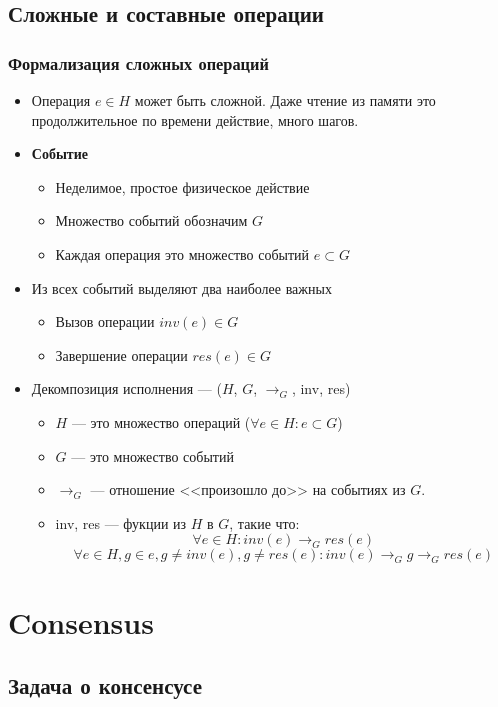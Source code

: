 \documentclass[10pt,a4paper,oneside,titlepage]{article}
\theoremstyle{plain}
\theoremstyle{defenition}
\begin{document}
\subsection{Сложные и составные операции}
\subsubsection{Формализация сложных операций}
\begin{itemize}
	\item Операция $e\in H$ может быть сложной. Даже чтение из памяти это продолжительное по времени действие, много шагов.
	\item {\bfseries Событие}
	\begin{itemize}
		\item Неделимое, простое физическое действие
		\item Множество событий обозначим $G$
		\item Каждая операция это множество событий $e\subset G$
	\end{itemize}
    \item Из всех событий выделяют два наиболее важных
    \begin{itemize}
    	\item Вызов операции $inv(e)\in G$
    	\item Завершение операции $res(e)\in G$
    \end{itemize}
    \item Декомпозиция исполнения --- ($H$, $G$, $\to_G$, inv, res)
    \begin{itemize}
    	\item $H$ --- это множество операций ($\forall e\in H\colon e\subset G$)
    	\item $G$ --- это множество событий
    	\item $\to_G$ --- отношение <<произошло до>> на событиях из $G$.
    	\item inv, res --- фукции из $H$ в $G$, такие что:
    	$$
    	\forall e\in H\colon inv(e)\to_Gres(e)
    	$$
    	$$
    	\forall e\in H, g\in e, g\ne inv(e), g\ne res(e)\colon inv(e)\to_Gg\to_Gres(e)
    	$$
    \end{itemize}
\end{itemize}

\section{Consensus}
\subsection{Задача о консенсусе}
\end{document}
